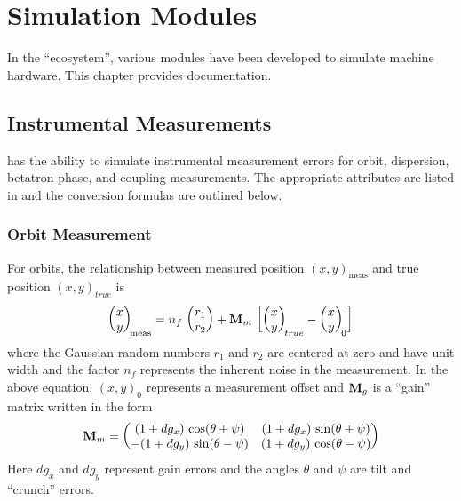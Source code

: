 \chapter{Simulation Modules}

In the \bmad ``ecosystem'', various modules have been developed to
simulate machine hardware. This chapter provides documentation.

\section{Instrumental Measurements}
\label{s:meas.calc}

\bmad has the ability to simulate instrumental measurement errors
for orbit, dispersion, betatron phase, and coupling measurements.
The appropriate attributes are listed in  and
the conversion formulas are outlined below.

\subsection{Orbit Measurement}

For orbits, the relationship between measured position $(x, y)_{\text{meas}}$ and true position $(x,
y)_{true}$ is
\begin{equation}
  \begin{pmatrix}
    x \\ y
  \end{pmatrix}_{\! \text{meas}}
  =
  n_f \, 
  \begin{pmatrix}
    r_1 \\ r_2
  \end{pmatrix}
  +
  {\bf M}_m \, 
  \left[
  \begin{pmatrix}
    x \\ y
  \end{pmatrix}_{\! true}
  -
  \begin{pmatrix}
    x \\ y
  \end{pmatrix}_{\! 0}
  \right]
  \label{xynrr}
\end{equation}
where the Gaussian random numbers $r_1$ and $r_2$ are centered at zero and have unit width and the
factor $n_f$ represents the inherent noise in the measurement. In the above equation, $(x, y)_0$ 
represents a measurement offset and ${\bf M}_g$ is a ``gain'' matrix written in the form
\begin{equation}
  {\bf M}_m
  =
  \begin{pmatrix}
     (1 + dg_x) \, \cos (\theta + \psi) & (1 + dg_x) \, \sin (\theta + \psi) \\
    -(1 + dg_y) \, \sin (\theta - \psi) & (1 + dg_y) \, \cos (\theta - \psi) 
  \end{pmatrix}
  \label{m1dg}
\end{equation}
Here $dg_x$ and $dg_y$ represent gain errors and the angles $\theta$ and $\psi$ are tilt and 
``crunch'' errors.

